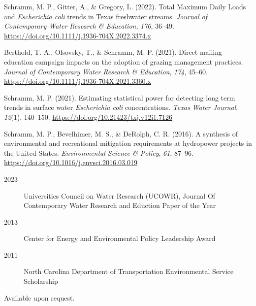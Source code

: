 \documentclass[localFont, alternative, showLinks, 11pt,
compact]{yaac-another-awesome-cv}
\newlength{\cslhangindent}
\newenvironment{CSLReferences}[2] %
 {%
  \setlength{\parindent}{0pt}
  \ifodd #1 \everypar{\setlength{\hangindent}{\cslhangindent}}\ignorespaces\fi
  \ifnum #2 > 0
  \setlength{\parskip}{#2\baselineskip}
  \fi
 }%
 {}
\begin{document}
\hypertarget{refs_peer}{}
\begin{CSLReferences}{1}{0}
\leavevmode{}%
Schramm, M. P., Gitter, A., \& Gregory, L. (2022). Total Maximum Daily
Loads and \emph{Escherichia coli} trends in Texas freshwater streams.
\emph{Journal of Contemporary Water Research \& Education}, \emph{176},
36--49. \url{https://doi.org/10.1111/j.1936-704X.2022.3374.x}

\leavevmode{}%
Berthold, T. A., Olsovsky, T., \& Schramm, M. P. (2021). Direct mailing
education campaign impacts on the adoption of grazing management
practices. \emph{Journal of Contemporary Water Research \& Education},
\emph{174}, 45--60.
\url{https://doi.org/10.1111/j.1936-704X.2021.3360.x}

\leavevmode{}%
Schramm, M. P. (2021). Estimating statistical power for detecting long
term trends in surface water \emph{Escherichia coli} concentrations.
\emph{Texas Water Journal}, \emph{12}(1), 140--150.
\url{https://doi.org/10.21423/txj.v12i1.7126}

\leavevmode{}%
Schramm, M. P., Bevelhimer, M. S., \& DeRolph, C. R. (2016). A synthesis
of environmental and recreational mitigation requirements at hydropower
projects in the United States. \emph{Environmental Science \& Policy},
\emph{61}, 87--96. \url{https://doi.org/10.1016/j.envsci.2016.03.019}

\end{CSLReferences}


\begin{description} \item [2023] Universities Council on Water Research (UCOWR), Journal Of Contemporary Water Research and Eduction Paper of the Year \item [2013] Center for Energy and Environmental Policy Leadership Award \item [2011] North Carolina Department of Transportation Environmental Service Scholarship \end{description}


Available upon request.
\end{document}
